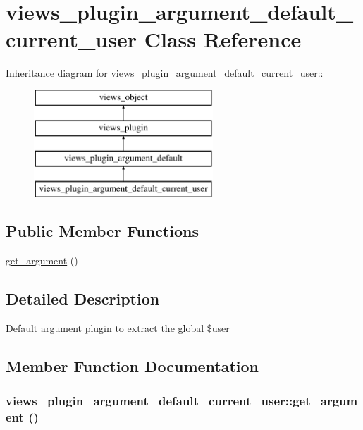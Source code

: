 \hypertarget{classviews__plugin__argument__default__current__user}{
\section{views\_\-plugin\_\-argument\_\-default\_\-current\_\-user Class Reference}
\label{classviews__plugin__argument__default__current__user}
}
Inheritance diagram for views\_\-plugin\_\-argument\_\-default\_\-current\_\-user::\begin{figure}[H]
\begin{center}
\leavevmode
\includegraphics[height=4cm]{classviews__plugin__argument__default__current__user}
\end{center}
\end{figure}
\subsection*{Public Member Functions}
\begin{CompactItemize}
\item 
\hyperlink{classviews__plugin__argument__default__current__user_a17e9b1b32a46e9030cf2edd0ed074b8}{get\_\-argument} ()
\end{CompactItemize}


\subsection{Detailed Description}
Default argument plugin to extract the global \$user 

\subsection{Member Function Documentation}
\hypertarget{classviews__plugin__argument__default__current__user_a17e9b1b32a46e9030cf2edd0ed074b8}{
\subsubsection[{get\_\-argument}]{\setlength{\rightskip}{0pt plus 5cm}views\_\-plugin\_\-argument\_\-default\_\-current\_\-user::get\_\-argument ()}}
\label{classviews__plugin__argument__default__current__user_a17e9b1b32a46e9030cf2edd0ed074b8}


